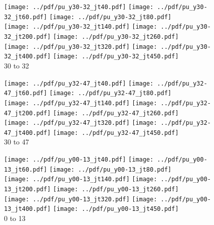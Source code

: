 \documentclass[landscape,10pt]{beamer} %
\begin{document}
\newpage

\begin{figure}[p]
\texttt{[image: ../pdf/pu\_y30-32\_jt40.pdf]}
\texttt{[image: ../pdf/pu\_y30-32\_jt60.pdf]}
\texttt{[image: ../pdf/pu\_y30-32\_jt80.pdf]}\\
\texttt{[image: ../pdf/pu\_y30-32\_jt140.pdf]}
\texttt{[image: ../pdf/pu\_y30-32\_jt200.pdf]}
\texttt{[image: ../pdf/pu\_y30-32\_jt260.pdf]}\\
\texttt{[image: ../pdf/pu\_y30-32\_jt320.pdf]}
\texttt{[image: ../pdf/pu\_y30-32\_jt400.pdf]}
\texttt{[image: ../pdf/pu\_y30-32\_jt450.pdf]}
\\
30 to 32
\end{figure}

\newpage

\begin{figure}[p]
\texttt{[image: ../pdf/pu\_y32-47\_jt40.pdf]}
\texttt{[image: ../pdf/pu\_y32-47\_jt60.pdf]}
\texttt{[image: ../pdf/pu\_y32-47\_jt80.pdf]}\\
\texttt{[image: ../pdf/pu\_y32-47\_jt140.pdf]}
\texttt{[image: ../pdf/pu\_y32-47\_jt200.pdf]}
\texttt{[image: ../pdf/pu\_y32-47\_jt260.pdf]}\\
\texttt{[image: ../pdf/pu\_y32-47\_jt320.pdf]}
\texttt{[image: ../pdf/pu\_y32-47\_jt400.pdf]}
\texttt{[image: ../pdf/pu\_y32-47\_jt450.pdf]}
\\
30 to 47
\end{figure}

\newpage

\begin{figure}[p]
\texttt{[image: ../pdf/pu\_y00-13\_jt40.pdf]}
\texttt{[image: ../pdf/pu\_y00-13\_jt60.pdf]}
\texttt{[image: ../pdf/pu\_y00-13\_jt80.pdf]}\\
\texttt{[image: ../pdf/pu\_y00-13\_jt140.pdf]}
\texttt{[image: ../pdf/pu\_y00-13\_jt200.pdf]}
\texttt{[image: ../pdf/pu\_y00-13\_jt260.pdf]}\\
\texttt{[image: ../pdf/pu\_y00-13\_jt320.pdf]}
\texttt{[image: ../pdf/pu\_y00-13\_jt400.pdf]}
\texttt{[image: ../pdf/pu\_y00-13\_jt450.pdf]}
\\
0 to 13
\end{figure}
\end{document}

